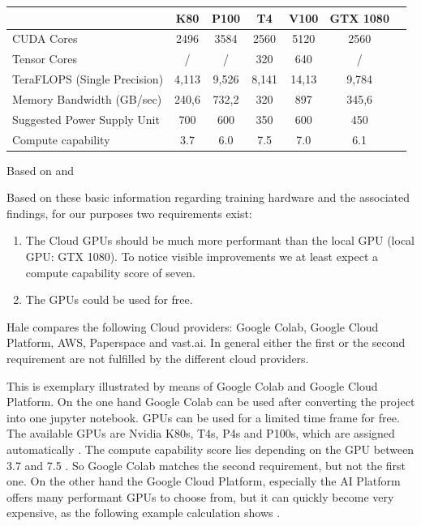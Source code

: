 \begin{center}
	\begin{tabular}[H]{l|c|c|c|c|c|c}
		& K80 & P100 & T4 & V100 & GTX 1080 \\
		\hline
		CUDA Cores & 2496 & 3584 & 2560 & 5120 & 2560 \\
		Tensor Cores & / & / & 320 & 640 & / \\
		TeraFLOPS (Single Precision) & 4,113 & 9,526 & 8,141 & 14,13 & 9,784  \\
		Memory Bandwidth (GB/sec) & 240,6 & 732,2 & 320 & 897 & 345,6 \\
		Suggested Power Supply Unit & 700 & 600 & 350 & 600 & 450 \\
		Compute capability & 3.7 & 6.0 & 7.5 & 7.0 & 6.1 \\ 
	\end{tabular}
	\label{table:hardware}
	Based on \cite{techpowerupeditorTechPowerUp} and \cite{nvidiaeditorCUDAGPUs2012}
\end{center}


Based on these basic information regarding training hardware and the associated findings, for our purposes two requirements exist:
\begin{enumerate}
	\item The Cloud GPUs should be much more performant than the local GPU (local GPU: GTX 1080). To notice visible improvements we at least expect a compute capability score of seven.
	\item The GPUs could be used for free.
\end{enumerate}

Hale \cite{haleBestDealsDeep2019} compares the following Cloud providers: Google Colab, Google Cloud Platform, AWS, Paperspace and vast.ai. In general either the first or the second requirement are not fulfilled by the different cloud providers. 

This is exemplary illustrated by means of Google Colab and Google Cloud Platform. 
On the one hand Google Colab can be used after converting the project into one jupyter notebook. GPUs can be used for a limited time frame for free. The available GPUs are Nvidia K80s, T4s, P4s and P100s, which are assigned automatically \cite{googleeditorColaboratoryGoogleFAQ}. The compute capability score lies depending on the GPU between 3.7 and 7.5 \cite{nvidiaeditorCUDAGPUs2012}. So Google Colab matches the second requirement, but not the first one. 
On the other hand the Google Cloud Platform, especially the AI Platform offers many performant GPUs to choose from, but it can quickly become very expensive, as the following example calculation shows \cite{googleeditorGPUsTrainierenModellen}. 

